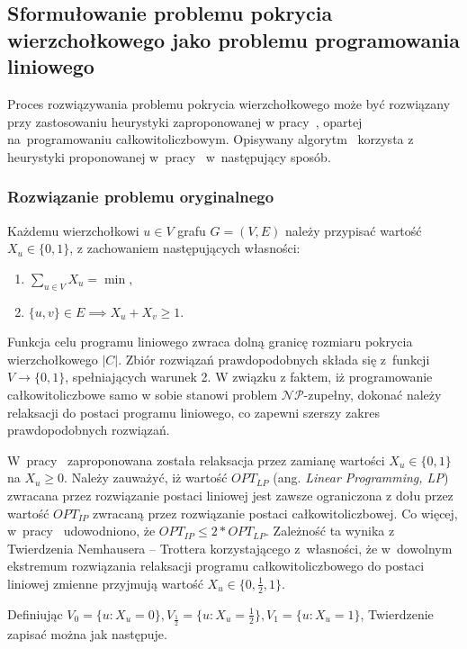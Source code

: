 \subsection{Sformułowanie problemu pokrycia wierzchołkowego jako problemu programowania liniowego}\label{section_kernelization_lp_formulation}

Proces rozwiązywania problemu pokrycia wierzchołkowego może być rozwiązany
przy zastosowaniu heurystyki zaproponowanej w pracy~\cite{hochbaum82}, opartej 
na~programowaniu całkowitoliczbowym.
Opisywany algorytm~\cite[rozdz.~4.2.2]{abukhzam03} korzysta z~ heurystyki proponowanej w~pracy~\cite{hochbaum82} 
w~następujący sposób.

\subsubsection{\textbf{Rozwiązanie problemu oryginalnego}}\label{ss_lp_original}
Każdemu wierzchołkowi $u \in V$ grafu $G=(V,E)$ należy przypisać wartość $X_u
\in \{0, 1\}$, z zachowaniem następujących własności:
\begin{enumerate}
  \item $\sum_{u \in V}X_u = \min$,
  \item $\{u,v\} \in E \implies X_u + X_v \geq 1$.
\end{enumerate}

Funkcja celu programu liniowego zwraca dolną granicę rozmiaru pokrycia wierzchołkowego $|C|$.
Zbiór rozwiązań prawdopodobnych składa się z~funkcji $V \to \{0, 1\}$,
spełniających warunek 2.
W związku z faktem, iż programowanie całkowitoliczbowe samo w sobie stanowi
problem $\mathcal{NP}$-zupełny, dokonać należy relaksacji do postaci programu liniowego, co
zapewni szerszy zakres prawdopodobnych rozwiązań.

W~pracy~\cite{khuller02} zaproponowana została relaksacja przez zamianę wartości 
$X_u \in \{0,1\}$ na $X_u \geq 0$.
Należy zauważyć, iż wartość $OPT_{LP}$ (ang. \emph{Linear Programming, LP}) zwracana przez rozwiązanie postaci 
liniowej jest zawsze ograniczona z dołu przez wartość $OPT_{IP}$ zwracaną przez 
rozwiązanie postaci całkowitoliczbowej.
Co więcej, w~pracy~\cite{khuller02} udowodniono, że $OPT_{IP} \leq 2*OPT_{LP}$.
Zależność ta wynika z Twierdzenia Nemhausera -- Trottera korzystającego
z~własności, że w~dowolnym ekstremum rozwiązania relaksacji programu
całkowitoliczbowego do postaci liniowej zmienne przyjmują wartość 
$X_u \in \{0, \frac{1}{2}, 1\}$.

Definiując $V_0 = \{u : X_u=0\}, V_{\frac{1}{2}}=\{u: X_u=\frac{1}{2}\},
V_1=\{u: X_u=1\}$, Twierdzenie zapisać można jak następuje.

